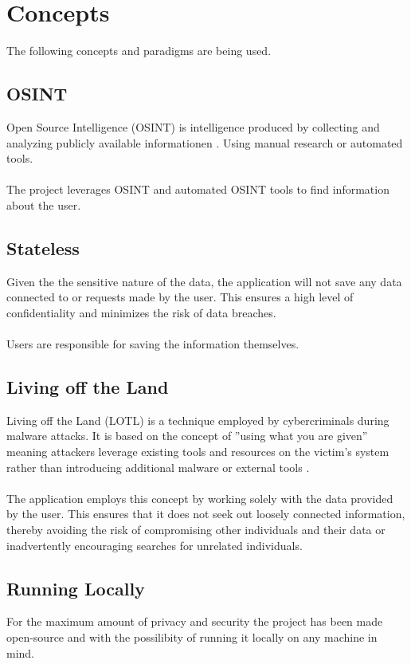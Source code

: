 \documentclass[
    a4paper,
    pagesize,
	pdftex,
    12pt,
]{scrartcl}
\begin{document}
\section{Concepts}
The following concepts and paradigms are being used.

\subsection{OSINT}
Open Source Intelligence (OSINT) is intelligence produced by collecting and analyzing  publicly available informationen \cite{what-is-osint}. Using manual research or automated tools.
\\ \\
The project leverages OSINT and automated OSINT tools to find information about the user.

\subsection{Stateless}
Given the the sensitive nature of the data, the application will not save any data connected to or requests made by the user. This ensures a high level of confidentiality and minimizes the risk of data breaches. 
\\ \\
Users are responsible for saving the information themselves. 

\subsection{Living off the Land}
Living off the Land (LOTL) is a technique employed by cybercriminals during malware attacks. It is based on the concept of ''using what you are given'' meaning attackers leverage existing tools and resources on the victim's system rather than introducing additional malware or external tools \cite{what-is-lotl}.
\\ \\
The application employs this concept by working solely with the data provided by the user. This ensures that it does not seek out loosely connected information, thereby avoiding the risk of compromising other individuals and their data or inadvertently encouraging searches for unrelated individuals.

\subsection{Running Locally}
For the maximum amount of privacy and security the project has been made open-source and with the possilibity of running it locally on any machine in mind. 
\end{document}
